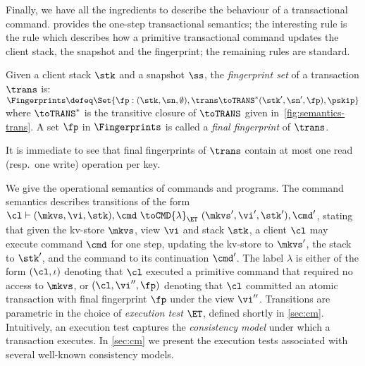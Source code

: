 Finally, we have all the ingredients to describe the behaviour of a transactional command.   provides the one-step transactional semantics; 
the interesting rule is the  rule which describes how a primitive transactional command updates the client stack, the snapshot and the fingerprint; 
the remaining rules are standard.



\begin{definition}
Given a client stack $\stk$ and a snapshot $\ss$, the \emph{fingerprint set} of a transaction $\trans$ is:
\(
\Fingerprints \defeq \Set{\fp : (\stk, \sn, \emptyset), \trans \toTRANS^* (\stk', \sn', \fp), \pskip }
\)
where $\toTRANS^*$ is the transitive closure of $\toTRANS$ given in~\cref{fig:semantics-trans}.  
A set $\fp$ in $\Fingerprints$ is called a \emph{final fingerprint} of $\trans$. 
\end{definition}
\noindent It is immediate to see that final fingerprints of $\trans$ contain at most one read (resp.\ one write) operation per key.

We give the operational semantics of commands and programs. 
The command semantics describes transitions of the form
$\cl \vdash (\mkvs, \vi, \stk), \cmd \ \toCMD{\lambda}_{\ET} \ (\mkvs', \vi', \stk') ,
\cmd'$, stating that given the kv-store $\mkvs$, view $\vi$ and stack $\stk$, 
a client $\cl$ may execute command $\cmd$ for one step, updating 
the kv-store to $\mkvs'$, the stack to $\stk'$, and the command to its continuation $\cmd'$.
The label $\lambda$ is either of the form $(\cl, \iota)$ denoting that $\cl$ executed a primitive command
that required no access to $\mkvs$, 
or $(\cl, \vi'', \fp)$ denoting that $\cl$ committed an atomic transaction with final fingerprint $\fp$ under the view $\vi''$.
Transitions are parametric in the choice of \emph{execution test} $\ET$, defined shortly in \cref{sec:cm}.
Intuitively, an execution test captures the \emph{consistency model} under which a transaction executes.
In \cref{sec:cm} we present the execution tests associated with several well-known consistency models.  %

